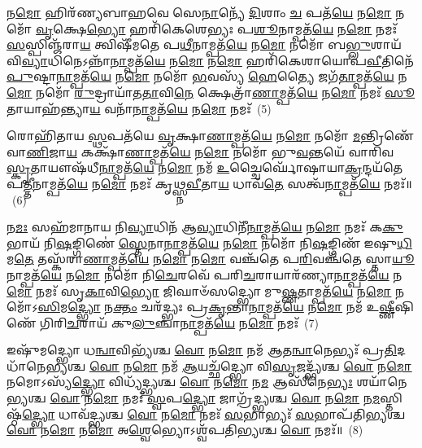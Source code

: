 {\anuvakamend[{𑌹𑌸𑍍𑌤𑍇᳴ \ul{𑌦𑌿}\-𑌕𑍍𑌷𑍍𑌵𑌿𑌷᳴𑌵 \ul{𑌉}\-𑌭𑌾\-\ul{𑌭𑍍𑌯𑌾𑌂} 𑌦𑍍𑌵𑌾𑌵𑌿𑍞᳴𑌶𑌤𑌿𑌶𑍍𑌚}]}%

𑌨\-\ul{𑌮𑍋} 𑌹𑌿𑌰᳴𑌣𑍍𑌯𑌬𑌾𑌹𑌵𑍇 𑌸𑍇\-\ul{𑌨𑌾}\-𑌨𑍍𑌯𑍇᳴ \ul{𑌦𑌿}\-𑌶𑌾𑌂 \ul{𑌚} 𑌪𑌤᳴\-\ul{𑌯𑍇} 𑌨\-\ul{𑌮𑍋} 𑌨𑌮𑍋᳴ \ul{𑌵𑍃}\-𑌕𑍍𑌷𑍇\-\ul{𑌭𑍍𑌯𑍋} 𑌹𑌰𑌿᳴𑌕𑍇𑌶𑍇𑌭𑍍𑌯𑌃 𑌪\-\ul{𑌶𑍂}\-𑌨𑌾𑌮𑍍𑌪𑌤᳴\-\ul{𑌯𑍇} 𑌨\-\ul{𑌮𑍋} 𑌨𑌮𑌃᳴ \ul{𑌸}\-𑌸𑍍𑌪𑌿𑌞𑍍𑌜᳴𑌰𑌾\-\ul{𑌯} 𑌤𑍍𑌵𑌿𑌷𑍀᳴𑌮𑌤𑍇 𑌪\-\ul{𑌥𑍀}\-𑌨𑌾𑌮𑍍𑌪𑌤᳴\-\ul{𑌯𑍇} 𑌨\-\ul{𑌮𑍋} 𑌨𑌮𑍋᳴ 𑌬\-\ul{𑌭𑍍𑌲𑍁}\-𑌶𑌾𑌯᳴ 𑌵𑌿\-\ul{𑌵𑍍𑌯𑌾}\-𑌧𑌿𑌨𑍇\-𑌽𑌨𑍍𑌨𑌾᳴\-\ul{𑌨𑌾}\-𑌮𑍍𑌪𑌤᳴\-\ul{𑌯𑍇} 𑌨\-\ul{𑌮𑍋} 𑌨\-\ul{𑌮𑍋} 𑌹𑌰𑌿᳴𑌕𑍇𑌶𑌾𑌯𑍋𑌪\-\ul{𑌵𑍀}\-𑌤𑌿𑌨𑍇᳴ \ul{𑌪𑍁}\-𑌷𑍍𑌟𑌾\-\ul{𑌨𑌾}\-𑌮𑍍𑌪𑌤᳴\-\ul{𑌯𑍇} 𑌨\-\ul{𑌮𑍋} 𑌨𑌮𑍋᳴ \ul{𑌭}\-𑌵𑌸𑍍𑌯᳴ \ul{𑌹𑍇}\-𑌤𑍍𑌯𑍈 𑌜𑌗᳴\-\ul{𑌤𑌾}\-𑌮𑍍𑌪𑌤᳴\-\ul{𑌯𑍇} 𑌨\-\ul{𑌮𑍋} 𑌨𑌮𑍋᳴ \ul{𑌰𑍁}\-𑌦𑍍𑌰𑌾𑌯𑌾᳴𑌤\-\ul{𑌤𑌾}\-𑌵𑌿\-\ul{𑌨𑍇} 𑌕𑍍𑌷𑍇𑌤𑍍𑌰𑌾᳴\-\ul{𑌣𑌾}\-𑌮𑍍𑌪𑌤᳴\-\ul{𑌯𑍇} 𑌨\-\ul{𑌮𑍋} 𑌨𑌮𑌃᳴ \ul{𑌸𑍂}\-𑌤𑌾𑌯𑌾𑌹᳴𑌨𑍍𑌤𑍍𑌯𑌾\-\ul{𑌯} 𑌵𑌨𑌾᳴\-\ul{𑌨𑌾}\-𑌮𑍍𑌪𑌤᳴\-\ul{𑌯𑍇} 𑌨\-\ul{𑌮𑍋} 𑌨𑌮𑌃᳴~(5)

𑌰𑍋𑌹𑌿᳴𑌤𑌾𑌯 \ul{𑌸𑍍𑌥}\-𑌪𑌤᳴𑌯𑍇 \ul{𑌵𑍃}\-𑌕𑍍𑌷𑌾\-\ul{𑌣𑌾}\-𑌮𑍍𑌪𑌤᳴\-\ul{𑌯𑍇} 𑌨\-\ul{𑌮𑍋} 𑌨𑌮𑍋᳴ \ul{𑌮}\-𑌨𑍍𑌤𑍍𑌰𑌿𑌣𑍇᳴ 𑌵𑌾\-\ul{𑌣𑌿}\-𑌜𑌾\-\ul{𑌯} 𑌕𑌕𑍍𑌷𑌾᳴\-\ul{𑌣𑌾}\-𑌮𑍍𑌪𑌤᳴\-\ul{𑌯𑍇} 𑌨\-\ul{𑌮𑍋} 𑌨𑌮𑍋᳴ 𑌭𑍁\-\ul{𑌵}\-𑌨𑍍𑌤𑌯𑍇᳴ 𑌵𑌾𑌰𑌿𑌵\-\ul{𑌸𑍍𑌕𑍃}\-𑌤𑌾𑌯𑍗𑌷᳴𑌧𑍀\-\ul{𑌨𑌾}\-𑌮𑍍𑌪𑌤᳴\-\ul{𑌯𑍇} 𑌨\-\ul{𑌮𑍋} 𑌨𑌮᳴ \ul{𑌉}\-𑌚𑍍𑌚𑍈𑌰𑍍𑌘𑍋᳴𑌷𑌾𑌯𑌾\-\ul{𑌕𑍍𑌰}\-𑌨𑍍𑌦𑌯᳴𑌤𑍇 𑌪\-\ul{𑌤𑍍𑌤𑍀}\-𑌨𑌾𑌮𑍍𑌪𑌤᳴\-\ul{𑌯𑍇} 𑌨\-\ul{𑌮𑍋} 𑌨𑌮𑌃᳴ 𑌕𑍃𑌥𑍍𑌸𑍍𑌨\-\ul{𑌵𑍀}\-𑌤𑌾\-\ul{𑌯} 𑌧𑌾𑌵᳴\-\ul{𑌤𑍇} 𑌸𑌤𑍍𑌵᳴\-\ul{𑌨𑌾}\-𑌮𑍍𑌪𑌤᳴\-\ul{𑌯𑍇} 𑌨𑌮𑌃᳴॥~(6)

{\anuvakamend[{𑌵𑌨𑌾᳴\-\ul{𑌨𑌾}\-𑌮𑍍𑌪𑌤᳴\-\ul{𑌯𑍇} 𑌨\-\ul{𑌮𑍋} 𑌨\-\ul{𑌮} 𑌏\-\ul{𑌕𑌾}\-𑌨𑍍𑌨\-\ul{𑌤𑍍𑌰𑌿}\-\-\ul{𑍞}\-𑌶𑌚𑍍𑌚᳴}]}%

𑌨\-\ul{𑌮𑌃} 𑌸𑌹᳴𑌮𑌾𑌨𑌾𑌯 𑌨𑌿\-\ul{𑌵𑍍𑌯𑌾}\-𑌧𑌿𑌨᳴ 𑌆\-\ul{𑌵𑍍𑌯𑌾}\-𑌧𑌿𑌨𑍀᳴\-\ul{𑌨𑌾}\-𑌮𑍍𑌪𑌤᳴\-\ul{𑌯𑍇} 𑌨\-\ul{𑌮𑍋} 𑌨𑌮𑌃᳴ 𑌕\-\ul{𑌕𑍁}\-𑌭𑌾𑌯᳴ 𑌨𑌿\-\ul{𑌷}\-𑌙𑍍𑌗𑌿𑌣𑍇॑ \ul{𑌸𑍍𑌤𑍇}\-𑌨𑌾\-\ul{𑌨𑌾}\-𑌮𑍍𑌪𑌤᳴\-\ul{𑌯𑍇} 𑌨\-\ul{𑌮𑍋} 𑌨𑌮𑍋᳴ 𑌨𑌿\-\ul{𑌷}\-𑌙𑍍𑌗𑌿𑌣᳴ 𑌇𑌷𑍁\-\ul{𑌧𑌿}\-𑌮\-\ul{𑌤𑍇} 𑌤𑌸𑍍𑌕᳴𑌰𑌾\-\ul{𑌣𑌾}\-𑌮𑍍𑌪𑌤᳴\-\ul{𑌯𑍇} 𑌨\-\ul{𑌮𑍋} 𑌨\-\ul{𑌮𑍋} 𑌵𑌞𑍍𑌚᳴𑌤𑍇 𑌪\-\ul{𑌰𑌿}\-𑌵𑌞𑍍𑌚᳴𑌤𑍇 𑌸𑍍𑌤𑌾\-\ul{𑌯𑍂}\-𑌨𑌾𑌮𑍍𑌪𑌤᳴\-\ul{𑌯𑍇} 𑌨\-\ul{𑌮𑍋} 𑌨𑌮𑍋᳴ 𑌨𑌿\-\ul{𑌚𑍇}\-𑌰𑌵𑍇᳴ 𑌪𑌰𑌿\-\ul{𑌚}\-𑌰𑌾𑌯𑌾𑌰᳴𑌣𑍍𑌯𑌾\-\ul{𑌨𑌾}\-𑌮𑍍𑌪𑌤᳴\-\ul{𑌯𑍇} 𑌨\-\ul{𑌮𑍋} 𑌨𑌮𑌃᳴ 𑌸𑍃\-\ul{𑌕𑌾}\-𑌵𑌿\-\ul{𑌭𑍍𑌯𑍋} 𑌜𑌿𑌘𑌾𑍞᳴𑌸𑌦𑍍𑌭𑍍𑌯𑍋 𑌮𑍁\-\ul{𑌷𑍍𑌣}\-𑌤𑌾𑌮𑍍𑌪𑌤᳴\-\ul{𑌯𑍇} 𑌨\-\ul{𑌮𑍋} 𑌨𑌮𑍋᳴\-𑌽\-\ul{𑌸𑌿}\-𑌮\-\ul{𑌦𑍍𑌭𑍍𑌯𑍋} 𑌨\-\ul{𑌕𑍍𑌤𑌂} 𑌚𑌰᳴𑌦𑍍𑌭𑍍𑌯𑌃 𑌪𑍍𑌰\-\ul{𑌕𑍃}\-𑌨𑍍𑌤𑌾\-\ul{𑌨𑌾}\-𑌮𑍍𑌪𑌤᳴\-\ul{𑌯𑍇} 𑌨\-\ul{𑌮𑍋} 𑌨𑌮᳴ 𑌉\-\ul{𑌷𑍍𑌣𑍀}\-𑌷𑌿𑌣𑍇᳴ 𑌗𑌿𑌰𑌿\-\ul{𑌚}\-𑌰𑌾𑌯᳴ 𑌕𑍁\-\ul{𑌲𑍁}\-𑌞𑍍𑌚𑌾\-\ul{𑌨𑌾}\-𑌮𑍍𑌪𑌤᳴\-\ul{𑌯𑍇} 𑌨\-\ul{𑌮𑍋} 𑌨𑌮𑌃᳴~(7)

𑌇𑌷𑍁᳴𑌮𑌦𑍍𑌭𑍍𑌯𑍋 𑌧\-\ul{𑌨𑍍𑌵𑌾}\-𑌵𑌿𑌭𑍍𑌯᳴𑌶𑍍𑌚 \ul{𑌵𑍋} 𑌨\-\ul{𑌮𑍋} 𑌨𑌮᳴ 𑌆𑌤\-\ul{𑌨𑍍𑌵𑌾}\-𑌨𑍇𑌭𑍍𑌯𑌃᳴ 𑌪𑍍𑌰\-\ul{𑌤𑌿}\-𑌦𑌧𑌾᳴𑌨𑍇𑌭𑍍𑌯𑌶𑍍𑌚 \ul{𑌵𑍋} 𑌨\-\ul{𑌮𑍋} 𑌨𑌮᳴ \ul{𑌆}\-𑌯𑌚𑍍𑌛᳴𑌦𑍍𑌭𑍍𑌯𑍋 𑌵𑌿\-\ul{𑌸𑍃}\-𑌜𑌦𑍍𑌭𑍍𑌯᳴𑌶𑍍𑌚 \ul{𑌵𑍋} 𑌨\-\ul{𑌮𑍋} 𑌨𑌮𑍋\-𑌽𑌸𑍍𑌯᳴\-\ul{𑌦𑍍𑌭𑍍𑌯𑍋} 𑌵𑌿𑌧𑍍𑌯᳴𑌦𑍍𑌭𑍍𑌯𑌶𑍍𑌚 \ul{𑌵𑍋} 𑌨\-\ul{𑌮𑍋} 𑌨\-\ul{𑌮} 𑌆𑌸𑍀᳴𑌨𑍇\-\ul{𑌭𑍍𑌯𑌃} 𑌶𑌯𑌾᳴𑌨𑍇𑌭𑍍𑌯𑌶𑍍𑌚 \ul{𑌵𑍋} 𑌨\-\ul{𑌮𑍋} 𑌨𑌮𑌃᳴ \ul{𑌸𑍍𑌵}\-𑌪\-\ul{𑌦𑍍𑌭𑍍𑌯𑍋} 𑌜𑌾𑌗𑍍𑌰᳴𑌦𑍍𑌭𑍍𑌯𑌶𑍍𑌚 \ul{𑌵𑍋} 𑌨\-\ul{𑌮𑍋} 𑌨\-\ul{𑌮}\-𑌸𑍍𑌤𑌿𑌷𑍍𑌠᳴\-\ul{𑌦𑍍𑌭𑍍𑌯𑍋} 𑌧𑌾𑌵᳴𑌦𑍍𑌭𑍍𑌯𑌶𑍍𑌚 \ul{𑌵𑍋} 𑌨\-\ul{𑌮𑍋} 𑌨𑌮𑌃᳴ \ul{𑌸}\-𑌭𑌾𑌭𑍍𑌯𑌃᳴ \ul{𑌸}\-𑌭𑌾𑌪᳴𑌤𑌿𑌭𑍍𑌯𑌶𑍍𑌚 \ul{𑌵𑍋} 𑌨\-\ul{𑌮𑍋} 𑌨\-\ul{𑌮𑍋} 𑌅\-\ul{𑌶𑍍𑌵𑍇}\-𑌭𑍍𑌯𑍋\-𑌽𑌶𑍍𑌵᳴𑌪𑌤𑌿𑌭𑍍𑌯𑌶𑍍𑌚 \ul{𑌵𑍋} 𑌨𑌮𑌃᳴॥~(8)

